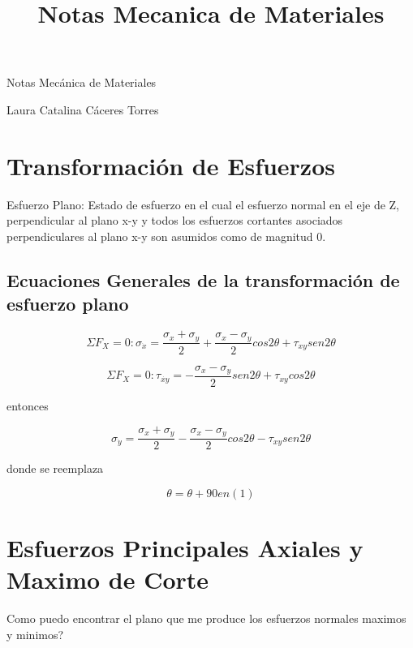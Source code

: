 \documentclass{article}
\title{ Notas Mecanica de Materiales}
\begin{document}
\begin{huge}
 Notas Mec\'anica de Materiales
\end{huge}

Laura Catalina C\'aceres Torres

\section{Transformaci\'on de Esfuerzos}

Esfuerzo Plano:  Estado de esfuerzo en el cual el esfuerzo normal en el eje  de Z, perpendicular al plano  x-y y todos los esfuerzos cortantes asociados perpendiculares 
al plano x-y son asumidos como de magnitud 0.

\subsection{Ecuaciones Generales de la transformaci\'on de esfuerzo plano}



\begin{equation}
 \Sigma F_{X}= 0:   \sigma_{\dot{x}}=\frac{\sigma_{x}+ \sigma_{y}}{2} + \frac{\sigma_{x} -\sigma_{y}}{2}  cos2\theta + \tau_{xy}sen2\theta 
\end{equation}



\begin{equation}
  \Sigma F_{X}= 0:   \tau_{\dot{xy}}= - \frac{\sigma_{x}-\sigma_{y}}{2}  sen2\theta + \tau_{xy}cos2\theta 
\end{equation}

entonces 



\begin{equation} 
\sigma_{\dot{y}} = \frac{\sigma_{x}+ \sigma_{y}}{2}-\frac{\sigma_{x}-\sigma_{y}}{2} cos2\theta -\tau_{xy}sen2\theta
\end{equation}

donde se reemplaza 


\begin{equation} 
\theta = \theta + 90 en (1)
\end{equation}



\section{Esfuerzos Principales Axiales y Maximo de Corte}

Como puedo encontrar el plano que me produce los esfuerzos normales maximos y minimos?
\end{document}
